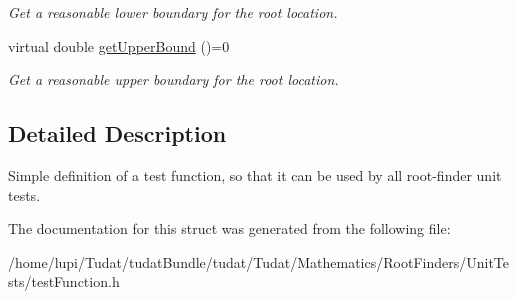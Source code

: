 \begin{DoxyCompactItemize}
\begin{DoxyCompactList}\small\item\em Get a reasonable lower boundary for the root location. \end{DoxyCompactList}\item 
virtual double \hyperlink{structtudat_1_1unit__tests_1_1TestFunction_ac7eb011b8e647185cdaf34dbddc06c27}{get\+Upper\+Bound} ()=0\hypertarget{structtudat_1_1unit__tests_1_1TestFunction_ac7eb011b8e647185cdaf34dbddc06c27}{}\label{structtudat_1_1unit__tests_1_1TestFunction_ac7eb011b8e647185cdaf34dbddc06c27}

\begin{DoxyCompactList}\small\item\em Get a reasonable upper boundary for the root location. \end{DoxyCompactList}\end{DoxyCompactItemize}


\subsection{Detailed Description}
Simple definition of a test function, so that it can be used by all root-\/finder unit tests. 

The documentation for this struct was generated from the following file\+:\begin{DoxyCompactItemize}
\item 
/home/lupi/\+Tudat/tudat\+Bundle/tudat/\+Tudat/\+Mathematics/\+Root\+Finders/\+Unit\+Tests/test\+Function.\+h\end{DoxyCompactItemize}
